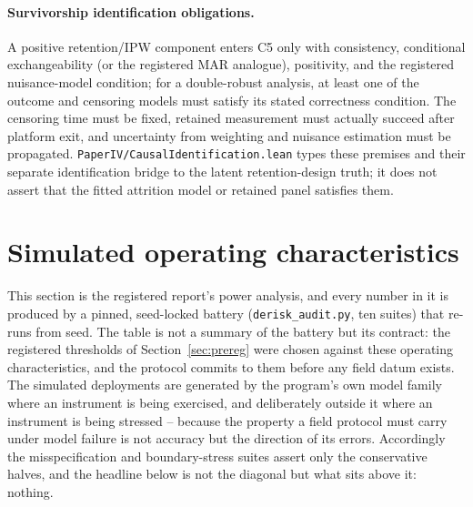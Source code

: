 \documentclass[11pt]{article}
\theoremstyle{definition}
\theoremstyle{remark}
\numberwithin{equation}{section}
\begin{document}
\paragraph{Survivorship identification obligations.} A positive retention/IPW
component enters C5 only with consistency, conditional exchangeability (or the
registered MAR analogue), positivity, and the registered nuisance-model
condition; for a double-robust analysis, at least one of the outcome and
censoring models must satisfy its stated correctness condition. The censoring
time must be fixed, retained measurement must actually succeed after platform
exit, and uncertainty from weighting and nuisance estimation must be
propagated. \texttt{PaperIV/CausalIdentification.lean} types these premises and
their separate identification bridge to the latent retention-design truth; it
does not assert that the fitted attrition model or retained panel satisfies
them.

\section{Simulated operating characteristics}\label{sec:opchar}

This section is the registered report's power analysis, and every number in it is produced by a pinned, seed-locked battery (\texttt{derisk\_audit.py}, ten suites) that re-runs from seed. The table is not a summary of the battery but its contract: the registered thresholds of Section~\ref{sec:prereg} were chosen against these operating characteristics, and the protocol commits to them before any field datum exists. The simulated deployments are generated by the program's own model family where an instrument is being exercised, and deliberately outside it where an instrument is being stressed -- because the property a field protocol must carry under model failure is not accuracy but the direction of its errors. Accordingly the misspecification and boundary-stress suites assert only the conservative halves, and the headline below is not the diagonal but what sits above it: nothing.
\end{document}
